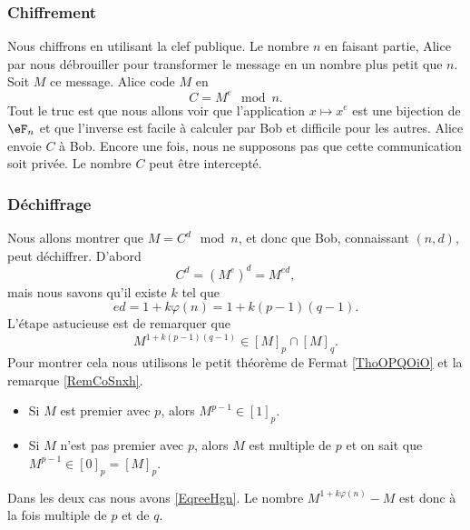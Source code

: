 \subsubsection{Chiffrement}

Nous chiffrons en utilisant la clef publique. Le nombre \( n\) en faisant partie, Alice par nous débrouiller pour transformer le message en un nombre plus petit que \( n\). Soit \( M\) ce message. Alice code \( M\) en
\begin{equation}
    C=M^e\mod n.
\end{equation}
Tout le truc est que nous allons voir que l'application \( x\mapsto x^e\) est une bijection de \( \eF_n\) et que l'inverse est facile à calculer par Bob et difficile pour les autres. Alice envoie \( C\) à Bob. Encore une fois, nous ne supposons pas que cette communication soit privée. Le nombre \( C\) peut être intercepté.

\subsubsection{Déchiffrage}

Nous allons montrer que \( M=C^d\mod n\), et donc que Bob, connaissant \( (n,d)\), peut déchiffrer. D'abord
\begin{equation}
    C^d=(M^e)^d=M^{ed},
\end{equation}
mais nous savons qu'il existe \( k\) tel que
\begin{equation}
    ed=1+k\varphi(n)=1+k(p-1)(q-1).
\end{equation}
L'étape astucieuse est de remarquer que
\begin{equation}    \label{EqreeHgn}
    M^{1+k(p-1)(q-1)}\in [M]_p\cap[M]_q.
\end{equation}
Pour montrer cela nous utilisons le petit théorème de Fermat \ref{ThoOPQOiO} et la remarque \ref{RemCoSnxh}.
\begin{itemize}
    \item Si \( M\) est premier avec \( p\), alors \( M^{p-1}\in[1]_p\).
    \item Si \( M\) n'est pas premier avec \( p\), alors \( M\) est multiple de \( p\) et on sait que \( M^{p-1}\in[0]_p=[M]_p\).
\end{itemize}
Dans les deux cas nous avons \eqref{EqreeHgn}. Le nombre \( M^{1+k\varphi(n)}-M\) est donc à la fois multiple de \( p\) et de \( q\).

